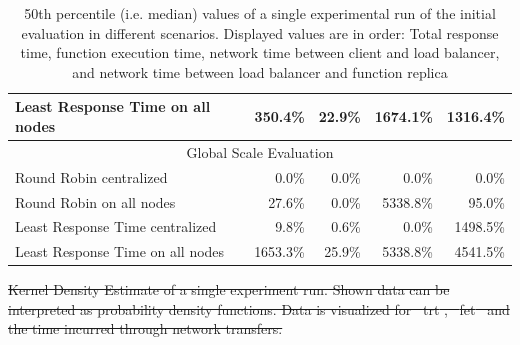 \documentclass[draft,final]{vutinfth} %
\providecommand{\DIFdeltex}[1]{{\protect\color{red}\sout{#1}}}                      %
\providecommand{\DIFdelbegin}{} %
\providecommand{\DIFdelFL}[1]{\DIFdel{#1}} %
\providecommand{\DIFdel}[1]{\texorpdfstring{\DIFdeltex{#1}}{}} %
\begin{document}
\begin{table}[]
\begin{tabular}{lrrrr}
Least Response Time on all nodes & 350.4\%                          & 22.9\%                           & 1674.1\%                               & 1316.4\%                               \\ \hline
\multicolumn{5}{c}{Global Scale Evaluation}                                                                                                                                              \\ \hline
Round Robin centralized          & 0.0\%                            & 0.0\%                            & 0.0\%                                  & 0.0\%                                  \\
Round Robin on all nodes         & 27.6\%                           & 0.0\%                            & 5338.8\%                               & 95.0\%                                 \\
Least Response Time centralized  & 9.8\%                            & 0.6\%                            & 0.0\%                                  & 1498.5\%                               \\
Least Response Time on all nodes & 1653.3\%                         & 25.9\%                           & 5338.8\%                               & 4541.5\%                               \\ \hline
\end{tabular}
\caption{50th percentile (i.e. median) values of a single experimental run of the initial evaluation in different scenarios. Displayed values are in order: Total response time, function execution time, network time between client and load balancer, and network time between load balancer and function replica}
\label{tab:initial_eval_results_q50}
\end{table}

\DIFdelbegin %
{%
\DIFdelFL{Kernel Density Estimate of a single experiment run. Shown data can be interpreted as probability density functions. Data is visualized for \mbox{%
\gls{trt}}\hskip0pt%
, \mbox{%
\gls{fet} }\hskip0pt%
and the time incurred through network transfers.}}
\end{document}
